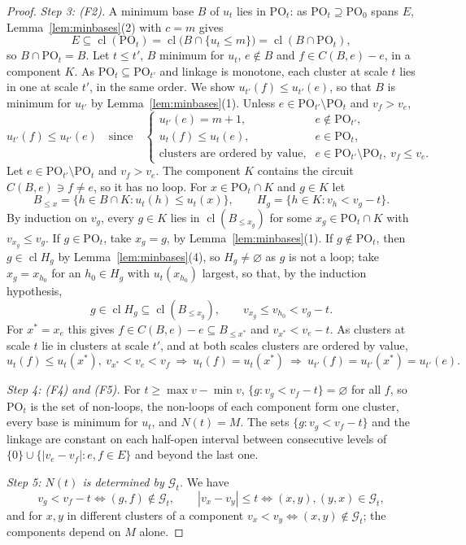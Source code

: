 \documentclass[11pt]{article}
\newcommand{\cl}{\operatorname{cl}}
\newcommand{\PO}{\mathrm{PO}}
\begin{document}
\begin{proof}
\emph{Step 3: (F2).}  A minimum base $B$ of $u_t$ lies in $\PO_t$: as
$\PO_t\supseteq\PO_0$ spans $E$, Lemma~\ref{lem:minbases}(2) with $c=m$ gives
\[
  E\subseteq\cl(\PO_t)=\cl\bigl(B\cap\{u_t\le m\}\bigr)=\cl(B\cap\PO_t),
\]
so $B\cap\PO_t=B$.  Let $t\le t'$, $B$ minimum for $u_t$, $e\notin B$ and
$f\in C(B,e)-e$, in a component $K$.  As $\PO_t\subseteq\PO_{t'}$ and linkage is
monotone, each cluster at scale $t$ lies in one at scale $t'$, in the same order.
We show $u_{t'}(f)\le u_{t'}(e)$, so that $B$ is minimum for $u_{t'}$ by
Lemma~\ref{lem:minbases}(1).  Unless $e\in\PO_{t'}\setminus\PO_t$ and $v_f>v_e$,
\[
  u_{t'}(f)\le u_{t'}(e)\quad\text{since}\quad
  \begin{cases}
    u_{t'}(e)=m+1,&e\notin\PO_{t'},\\
    u_t(f)\le u_t(e),&e\in\PO_t,\\
    \text{clusters are ordered by value},&e\in\PO_{t'}\setminus\PO_t,\ v_f\le v_e.
  \end{cases}
\]
Let $e\in\PO_{t'}\setminus\PO_t$ and $v_f>v_e$.  The component $K$ contains the
circuit $C(B,e)\ni f\ne e$, so it has no loop.  For $x\in\PO_t\cap K$ and $g\in K$
let
\[
  B_{\le x}=\{h\in B\cap K:u_t(h)\le u_t(x)\},\qquad H_g=\{h\in K:v_h<v_g-t\}.
\]
By induction on $v_g$, every $g\in K$ lies in $\cl(B_{\le x_g})$ for some
$x_g\in\PO_t\cap K$ with $v_{x_g}\le v_g$.  If $g\in\PO_t$, take $x_g=g$, by
Lemma~\ref{lem:minbases}(1).  If $g\notin\PO_t$, then $g\in\cl H_g$ by
Lemma~\ref{lem:minbases}(4), so $H_g\ne\varnothing$ as $g$ is not a loop; take
$x_g=x_{h_0}$ for an $h_0\in H_g$ with $u_t(x_{h_0})$ largest, so that, by the
induction hypothesis,
\[
  g\in\cl H_g\subseteq\cl(B_{\le x_g}),\qquad v_{x_g}\le v_{h_0}<v_g-t.
\]
For $x^{*}=x_e$ this gives $f\in C(B,e)-e\subseteq B_{\le x^{*}}$ and
$v_{x^{*}}<v_e-t$.  As clusters at scale $t$ lie in clusters at scale $t'$, and at
both scales clusters are ordered by value,
\[
  u_t(f)\le u_t(x^{*}),\ v_{x^{*}}<v_e<v_f\ \Rightarrow\ u_t(f)=u_t(x^{*})\
  \Rightarrow\ u_{t'}(f)=u_{t'}(x^{*})=u_{t'}(e).
\]

\emph{Step 4: (F4) and (F5).}  For $t\ge\max v-\min v$, $\{g:v_g<v_f-t\}=\varnothing$
for all $f$, so $\PO_t$ is the set of non-loops, the non-loops of each component
form one cluster, every base is minimum for $u_t$, and $N(t)=M$.  The sets
$\{g:v_g<v_f-t\}$ and the linkage are constant on each half-open interval between
consecutive levels of $\{0\}\cup\{|v_e-v_f|:e,f\in E\}$ and beyond the last one.

\emph{Step 5: $N(t)$ is determined by $\mathcal G_t$.}  We have
\[
  v_g<v_f-t\iff(g,f)\notin\mathcal G_t,\qquad |v_x-v_y|\le t\iff(x,y),(y,x)\in\mathcal G_t,
\]
and for $x,y$ in different clusters of a component $v_x<v_y\iff(x,y)\notin\mathcal G_t$;
the components depend on $M$ alone.
\end{proof}
\end{document}
